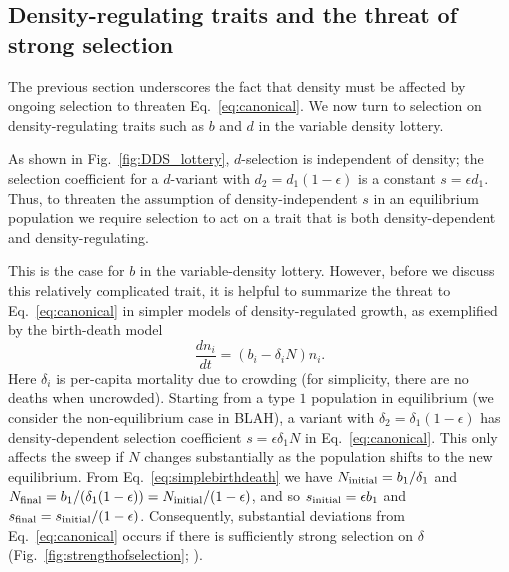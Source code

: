 \documentclass[12pt]{article}
\begin{document}
\subsection*{Density-regulating traits and the threat of strong selection}

The previous section underscores the fact that density must be affected by ongoing selection to threaten Eq.~\eqref{eq:canonical}. We now turn to selection on density-regulating traits such as $b$ and $d$ in the variable density lottery. 

As shown in Fig.~\ref{fig:DDS_lottery}, $d$-selection is independent of density; the selection coefficient for a $d$-variant with $d_2= d_1(1-\epsilon)$ is a constant $s=\epsilon d_1$. Thus, to threaten the assumption of density-independent $s$ in an equilibrium population we require selection to act on a trait that is both density-dependent and density-regulating. 

This is the case for $b$ in the variable-density lottery. However, before we discuss this relatively complicated trait, it is helpful to summarize the threat to Eq.~\eqref{eq:canonical} in simpler models of density-regulated growth, as exemplified by the birth-death model \citep{kostitzin_1939} 
\begin{equation}
\frac{d n_i}{dt}=(b_i -\delta_iN) n_i. \label{eq:simplebirthdeath}
\end{equation}
Here $\delta_i$ is per-capita mortality due to crowding (for simplicity, there are no deaths when uncrowded). Starting from a type $1$ population in equilibrium (we consider the non-equilibrium case in BLAH), a variant with $\delta_2=\delta_1(1-\epsilon)$ has density-dependent selection coefficient $s=\epsilon \delta_1 N$ in Eq.~\eqref{eq:canonical}. This only affects the sweep if $N$ changes substantially as the population shifts to the new equilibrium. From Eq.~\eqref{eq:simplebirthdeath} we have $N_{\rm initial}=b_1/\delta_1$ and $N_{\rm final}=b_1/(\delta_1(1-\epsilon))=N_{\rm initial}/(1-\epsilon)$, and so $s_{\rm initial}= \epsilon b_1$ and $s_{\rm final}=s_{\rm initial}/(1-\epsilon)$. Consequently, substantial deviations from Eq.~\eqref{eq:canonical} occurs if there is sufficiently strong selection on $\delta$ (Fig.~\ref{fig:strengthofselection}; \citealt{kimura1969natural,crow_1970}).
\end{document}
